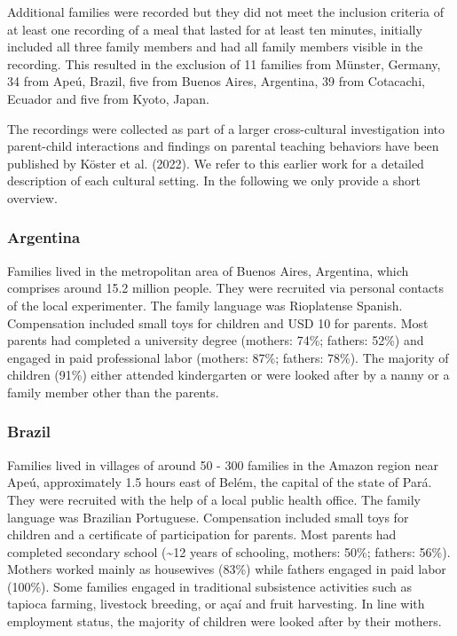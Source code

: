 \documentclass[
  man,floatsintext]{apa6}
\begin{document}
Additional families were recorded but they did not meet the inclusion criteria of at least one recording of a meal that lasted for at least ten minutes, initially included all three family members and had all family members visible in the recording. This resulted in the exclusion of 11 families from Münster, Germany, 34 from Apeú, Brazil, five from Buenos Aires, Argentina, 39 from Cotacachi, Ecuador and five from Kyoto, Japan.

The recordings were collected as part of a larger cross-cultural investigation into parent-child interactions and findings on parental teaching behaviors have been published by Köster et al. (2022). We refer to this earlier work for a detailed description of each cultural setting. In the following we only provide a short overview.

\hypertarget{argentina}{%
\subsubsection{Argentina}\label{argentina}}

Families lived in the metropolitan area of Buenos Aires, Argentina, which comprises around 15.2 million people. They were recruited via personal contacts of the local experimenter. The family language was Rioplatense Spanish. Compensation included small toys for children and USD 10 for parents. Most parents had completed a university degree (mothers: 74\%; fathers: 52\%) and engaged in paid professional labor (mothers: 87\%; fathers: 78\%). The majority of children (91\%) either attended kindergarten or were looked after by a nanny or a family member other than the parents.

\hypertarget{brazil}{%
\subsubsection{Brazil}\label{brazil}}

Families lived in villages of around 50 - 300 families in the Amazon region near Apeú, approximately 1.5 hours east of Belém, the capital of the state of Pará. They were recruited with the help of a local public health office. The family language was Brazilian Portuguese. Compensation included small toys for children and a certificate of participation for parents. Most parents had completed secondary school (\textasciitilde12 years of schooling, mothers: 50\%; fathers: 56\%). Mothers worked mainly as housewives (83\%) while fathers engaged in paid labor (100\%). Some families engaged in traditional subsistence activities such as tapioca farming, livestock breeding, or açaí and fruit harvesting. In line with employment status, the majority of children were looked after by their mothers.
\end{document}
